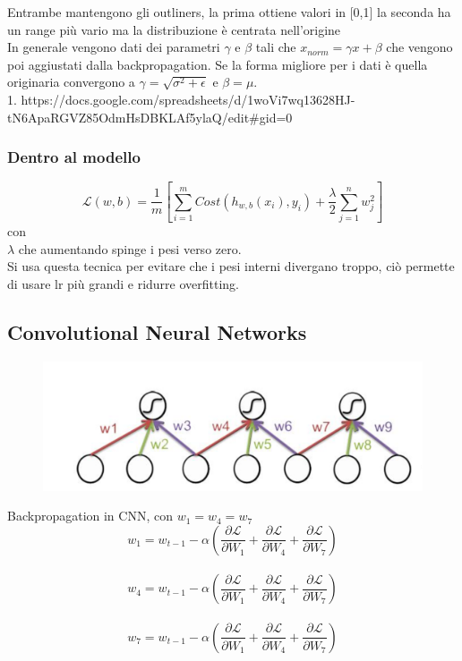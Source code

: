 \documentclass[]{article}
\newcommand{\Lagr}{\mathcal{L}}
\begin{document}
Entrambe mantengono gli outliners, la prima ottiene valori in [0,1] la seconda ha un range più vario ma la distribuzione è centrata nell'origine\\
In generale vengono dati dei parametri $\gamma$ e $\beta$ tali che $x_{norm}=\gamma x+\beta$ che vengono poi aggiustati dalla backpropagation. Se la forma migliore per i dati è quella originaria convergono a $\gamma = \sqrt{\sigma^2+\epsilon}$ e $\beta = \mu$. \\

\vfill
1. https://docs.google.com/spreadsheets/d/1woVi7wq13628HJ-tN6ApaRGVZ85OdmHsDBKLAf5ylaQ/edit\#gid=0

\subsubsection{Dentro al modello}
\[ \Lagr(w,b) = \frac{1}{m}[\sum_{i=1}^m Cost(h_{w,b}(x_i), y_i) + \frac{\lambda}{2} \sum_{j=1}^n w_j^2] \] 
con\\
$\lambda$ che aumentando spinge i pesi verso zero.\\
Si usa questa tecnica per evitare che i pesi interni divergano troppo, ciò permette di usare lr più grandi e ridurre overfitting. 





\subsection{Convolutional Neural Networks}
\begin{figure}[h] 
\centering 
\includegraphics[scale=0.42]{cnn} 
\end{figure} 
Backpropagation in CNN, con $w_1 = w_4 = w_7$ \\
\[w_1 = w_{t-1} - \alpha (\frac{\partial \Lagr}{\partial W_1} + \frac{\partial \Lagr}{\partial W_4} + \frac{\partial \Lagr}{\partial W_7} ) \] \\
\[w_4 = w_{t-1} - \alpha (\frac{\partial \Lagr}{\partial W_1} + \frac{\partial \Lagr}{\partial W_4} + \frac{\partial \Lagr}{\partial W_7} ) \] \\
\[w_7 = w_{t-1} - \alpha (\frac{\partial \Lagr}{\partial W_1} + \frac{\partial \Lagr}{\partial W_4} + \frac{\partial \Lagr}{\partial W_7} ) \] \\
\end{document}
